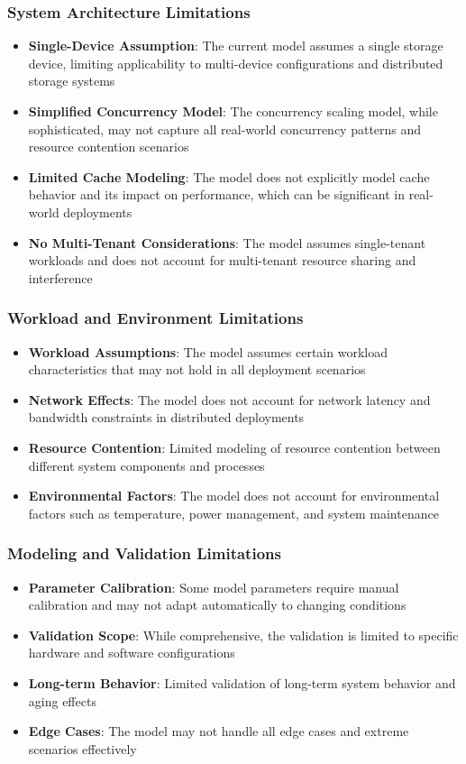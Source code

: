 \documentclass[11pt]{article}
\begin{document}
\subsubsection{System Architecture Limitations}
\begin{itemize}
    \item \textbf{Single-Device Assumption}: The current model assumes a single storage device, limiting applicability to multi-device configurations and distributed storage systems
    \item \textbf{Simplified Concurrency Model}: The concurrency scaling model, while sophisticated, may not capture all real-world concurrency patterns and resource contention scenarios
    \item \textbf{Limited Cache Modeling}: The model does not explicitly model cache behavior and its impact on performance, which can be significant in real-world deployments
    \item \textbf{No Multi-Tenant Considerations}: The model assumes single-tenant workloads and does not account for multi-tenant resource sharing and interference
\end{itemize}

\subsubsection{Workload and Environment Limitations}
\begin{itemize}
    \item \textbf{Workload Assumptions}: The model assumes certain workload characteristics that may not hold in all deployment scenarios
    \item \textbf{Network Effects}: The model does not account for network latency and bandwidth constraints in distributed deployments
    \item \textbf{Resource Contention}: Limited modeling of resource contention between different system components and processes
    \item \textbf{Environmental Factors}: The model does not account for environmental factors such as temperature, power management, and system maintenance
\end{itemize}

\subsubsection{Modeling and Validation Limitations}
\begin{itemize}
    \item \textbf{Parameter Calibration}: Some model parameters require manual calibration and may not adapt automatically to changing conditions
    \item \textbf{Validation Scope}: While comprehensive, the validation is limited to specific hardware and software configurations
    \item \textbf{Long-term Behavior}: Limited validation of long-term system behavior and aging effects
    \item \textbf{Edge Cases}: The model may not handle all edge cases and extreme scenarios effectively
\end{itemize}
\end{document}
